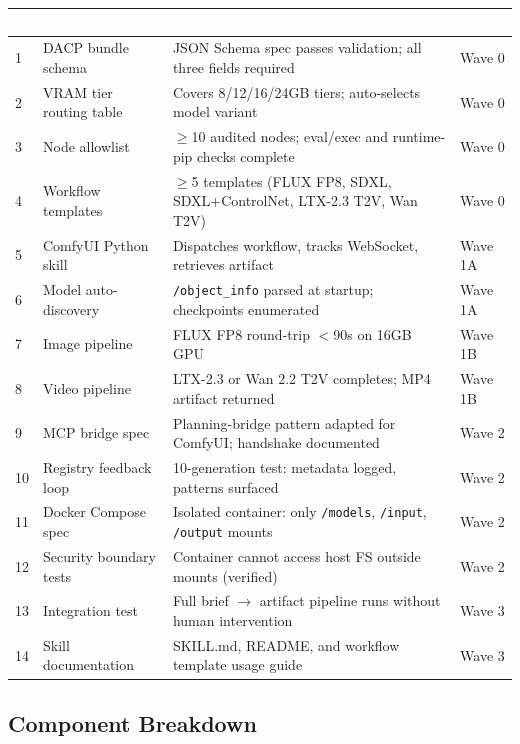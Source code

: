 \documentclass[11pt,letterpaper]{article}
\newcommand{\tableheader}[1]{\textbf{\sffamily\textcolor{white}{#1}}}
\begin{document}
\begin{center}
\begin{tabularx}{\textwidth}{C{0.5cm}L{4cm}XL{2.5cm}}
\toprule
{}
\tableheader{\#} & \tableheader{Deliverable} & \tableheader{Acceptance Criterion} & \tableheader{Wave} \\
 & DACP bundle schema & JSON Schema spec passes validation; all three fields required & Wave 0 \\
2 & VRAM tier routing table & Covers 8/12/16/24GB tiers; auto-selects model variant & Wave 0 \\
3 & Node allowlist & $\geq$10 audited nodes; eval/exec and runtime-pip checks complete & Wave 0 \\
4 & Workflow templates & $\geq$5 templates (FLUX FP8, SDXL, SDXL+ControlNet, LTX-2.3 T2V, Wan T2V) & Wave 0 \\
5 & ComfyUI Python skill & Dispatches workflow, tracks WebSocket, retrieves artifact & Wave 1A \\
6 & Model auto-discovery & \texttt{/object\_info} parsed at startup; checkpoints enumerated & Wave 1A \\
7 & Image pipeline & FLUX FP8 round-trip $<$90s on 16GB GPU & Wave 1B \\
8 & Video pipeline & LTX-2.3 or Wan 2.2 T2V completes; MP4 artifact returned & Wave 1B \\
9 & MCP bridge spec & Planning-bridge pattern adapted for ComfyUI; handshake documented & Wave 2 \\
10 & Registry feedback loop & 10-generation test: metadata logged, patterns surfaced & Wave 2 \\
11 & Docker Compose spec & Isolated container: only \texttt{/models}, \texttt{/input}, \texttt{/output} mounts & Wave 2 \\
12 & Security boundary tests & Container cannot access host FS outside mounts (verified) & Wave 2 \\
13 & Integration test & Full brief $\to$ artifact pipeline runs without human intervention & Wave 3 \\
14 & Skill documentation & SKILL.md, README, and workflow template usage guide & Wave 3 \\
\bottomrule
\end{tabularx}
\end{center}

\subsection{Component Breakdown}
\end{document}
